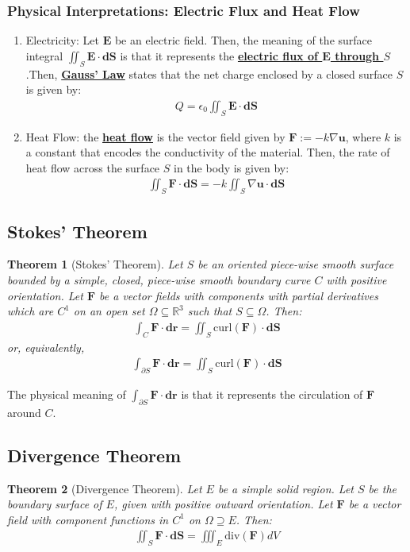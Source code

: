 \documentclass[reqno,11pt]{amsart}
\newtheorem{theorem}{Theorem}
\theoremstyle{definition}
\theoremstyle{remark}
\newcommand{\R}{\mathbb{R}}
\newcommand{\dfn}[1]{\underline{\textbf{#1}}}
\begin{document}
\subsubsection{Physical Interpretations: Electric Flux and Heat Flow}
\begin{enumerate}
	\item Electricity: Let $\mathbf{E}$ be an electric field. Then, the meaning of the surface integral $\iint_S \mathbf{E} \cdot \mathbf{dS}$ is that it represents the \dfn{electric flux of $\mathbf{E}$ through $S$}.Then, \dfn{Gauss' Law} states that the net charge enclosed by a closed surface $S$ is given by:
	\begin{align}
		Q = \epsilon_0 \iint_S \mathbf{E} \cdot \mathbf{dS} 	
	\end{align}
	\item Heat Flow: the \dfn{heat flow} is the vector field given by $\mathbf{F} := - k \nabla \mathbf{u}$, where $k$ is a constant that encodes the conductivity of the material. Then, the rate of heat flow across the surface $S$ in the body is given by:
	\begin{align}
		\iint_S \mathbf{F} \cdot \mathbf{dS} = -k \iint_S \nabla \mathbf{u} \cdot \mathbf{dS} 	
	\end{align}
\end{enumerate}
\subsection{Stokes' Theorem}
\begin{theorem}[Stokes' Theorem]
	Let $S$ be an oriented piece-wise smooth surface bounded by a simple, closed, piece-wise smooth boundary curve $C$ with positive orientation. Let $\mathbf{F}$ be a vector fields with components with partial derivatives which are $C^1$ on an open set $\Omega \subseteq \R^3$ such that $S \subseteq \Omega$. Then: 
	\begin{align}
		\int_C \mathbf{F} \cdot \mathbf{dr} = \iint_S \mathrm{curl}( \mathbf{F} ) \cdot \mathbf{dS}	
	\end{align}
	or, equivalently, 
	\begin{align}
		\int_{\partial S} \mathbf{F} \cdot \mathbf{dr} = \iint_S \mathrm{curl}(\mathbf{F}) \cdot \mathbf{dS} 	
	\end{align}
\end{theorem}
The physical meaning of $\int_{\partial S} \mathbf{F} \cdot \mathbf{dr}$ is that it represents the circulation of $\mathbf{F}$ around $C$.
\subsection{Divergence Theorem}
\begin{theorem}[Divergence Theorem]
	Let $E$ be a simple solid region. Let $S$ be the boundary surface of $E$, given with positive outward orientation. Let $\mathbf{F}$ be a vector field with component functions in $C^1$ on $\Omega \supseteq E$. Then: 
	\begin{align}
		\iint_S \mathbf{F} \cdot \mathbf{dS} = \iiint_E \mathrm{div}(\mathbf{F}) dV \end{align}
\end{theorem}
\end{document}
